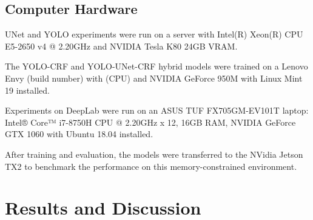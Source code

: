 \documentclass[10pt, journal, compsoc]{IEEEtran}
\begin{document}
\subsection{Computer Hardware}
UNet and YOLO experiments were run on a server with Intel(R) Xeon(R) CPU E5-2650 v4 @ 2.20GHz and NVIDIA Tesla K80 24GB VRAM.

The YOLO-CRF and YOLO-UNet-CRF hybrid models were trained on a Lenovo Envy (build number) with (CPU) and NVIDIA GeForce 950M with Linux Mint 19 installed.

Experiments on DeepLab were run on an ASUS TUF FX705GM-EV101T laptop: Intel® Core™ i7-8750H CPU @ 2.20GHz x 12, 16GB RAM, NVIDIA GeForce GTX 1060 with Ubuntu 18.04 installed.

After training and evaluation, the models were transferred to the NVidia Jetson TX2 to benchmark the performance on this memory-constrained environment.
\section{Results and Discussion}
\end{document}
